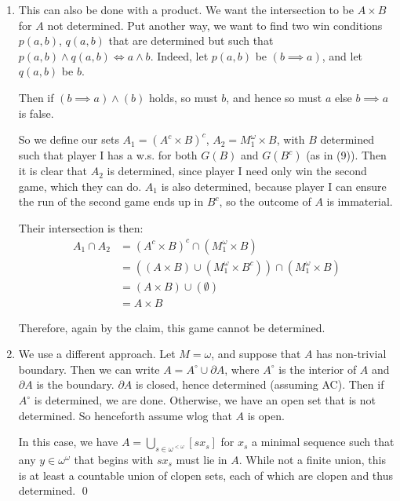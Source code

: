\documentclass[]{article}
\newcommand{\om}{\omega}
\newcommand{\lom}{{<\omega}}
\begin{document}
\begin{enumerate}[label = (\arabic*)]
\begin{enumerate}[label = (\alph*)]
        \item This can also be done with a product. We want the intersection to be $A\times B$ for $A$ not determined. Put another way, we want to find two win conditions $p(a,b)$, $q(a,b)$ that are determined but such that $p(a,b)\land q(a,b) \iff a\land b$. Indeed, let $p(a,b)$ be $(b\implies a)$, and let $q(a,b)$ be $b$.
        
        Then if $(b\implies a) \land (b)$ holds, so must $b$, and hence so must $a$ else $b\implies a$ is false.

        So we define our sets $A_1 = (A^c\times B)^c$, $A_2 = M_1^\om\times B$, with $B$ determined such that player I has a w.s. for both $G(B)$ and $G(B^c)$ (as in (9)). Then it is clear that $A_2$ is determined, since player I need only win the second game, which they can do. $A_1$ is also determined, because player I can ensure the run of the second game ends up in $B^c$, so the outcome of $A$ is immaterial.
        
        Their intersection is then:
        \begin{align*}
            A_1\cap A_2 &= (A^c \times B)^c \cap (M_1^\om\times B)\\
            &= ((A\times B)\cup (M_1^\om\times B^c))\cap (M_1^\om \times B)\\
            &= (A\times B)\cup (\emptyset)\\
            &= A\times B
        \end{align*}

        Therefore, again by the claim, this game cannot be determined.

        \item We use a different approach. Let $M = \om$, and suppose that $A$ has non-trivial boundary. Then we can write $A = A^\circ \cup \partial A$, where $A^\circ$ is the interior of $A$ and $\partial A$ is the boundary. $\partial A$ is closed, hence determined (assuming AC). Then if $A^\circ$ is determined, we are done. Otherwise, we have an open set that is not determined. So henceforth assume wlog that $A$ is open.
    
        In this case, we have $A = \bigcup_{s \in \om^\lom}[sx_{s}]$ for $x_s$ a minimal sequence such that any $y \in \om^\om$ that begins with $sx_s$ must lie in $A$. While not a finite union, this is at least a countable union of clopen sets, each of which are clopen and thus determined. \qed
        
    \end{enumerate}




\end{enumerate}
\end{document}
